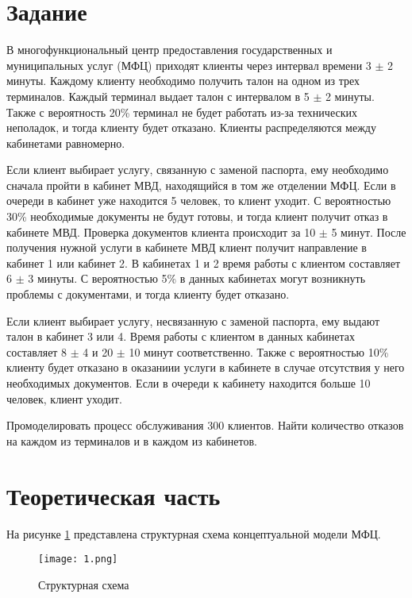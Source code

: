 \documentclass[a4paper,fontsize=12bp]{extreport}
\begin{document}
\section*{Задание}

В многофункциональный центр предоставления государственных и муниципальных услуг (МФЦ) приходят клиенты через интервал времени 3 $\pm$ 2 минуты. Каждому клиенту необходимо получить талон на одном из трех терминалов. Каждый терминал выдает талон с интервалом в 5 $\pm$ 2 минуты. Также с вероятность 20\%  терминал не будет работать из-за технических неполадок, и тогда клиенту будет отказано. Клиенты распределяются между кабинетами равномерно. 

Если клиент выбирает услугу, связанную с заменой паспорта, ему необходимо сначала пройти в кабинет МВД, находящийся в том же отделении МФЦ. Если в очереди в кабинет уже находится 5 человек, то клиент уходит. С вероятностью 30\%  необходимые документы не будут готовы, и тогда клиент получит отказ в кабинете МВД. Проверка документов  клиента происходит за 10 $\pm$ 5 минут. После получения нужной услуги в кабинете МВД клиент получит направление в кабинет 1 или кабинет 2. В кабинетах 1 и 2 время работы с клиентом составляет 6 $\pm$ 3 минуты. С вероятностью 5\% в данных кабинетах могут возникнуть проблемы с документами, и тогда клиенту будет отказано. 

Если клиент выбирает услугу, несвязанную с заменой паспорта, ему выдают талон в кабинет 3 или 4. Время работы с клиентом в данных кабинетах составляет 8 $\pm$ 4 и 20 $\pm$ 10 минут соответственно. Также с вероятностью 10\% клиенту будет отказано в оказаниии услуги в кабинете в случае отсутствия у него необходимых документов. Если в очереди к кабинету  находится больше 10 человек, клиент уходит. 
 
Промоделировать процесс обслуживания 300 клиентов. Найти количество отказов на каждом из терминалов и в каждом из кабинетов.
	
	
\section*{Теоретическая часть}
	
На рисунке \ref{fig:1} представлена структурная схема концептуальной модели МФЦ.

\begin{figure}[H]
    \texttt{[image: 1.png]}
    \caption{Структурная схема}
    \label{fig:1}
\end{figure}
\end{document}
